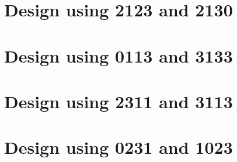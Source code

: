 \section{Design using 2123 and 2130}


 \begin{center}




 \end{center}



\section{Design using 0113 and 3133}


 \begin{center}




 \end{center}



\section{Design using 2311 and 3113}


 \begin{center}




 \end{center}



\section{Design using 0231 and 1023}

